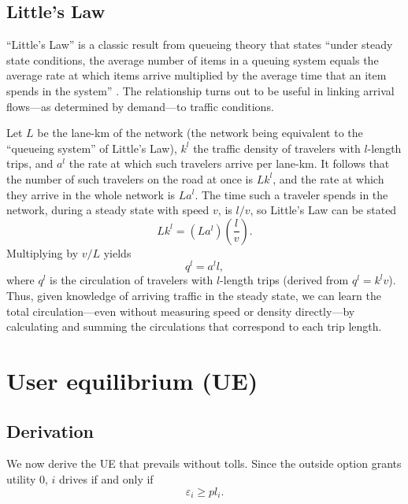 \documentclass[preprint,authoryear]{elsarticle}
\newcommand{\ve}{\varepsilon}
\begin{document}
\subsection{Little's Law}

``Little's Law'' is a classic result from queueing theory that states ``under steady state conditions, the average number of items in a queuing system equals the average rate at which items arrive multiplied by the average time that an item spends in the system'' \citep[p. 82]{Little2008}. The relationship turns out to be useful in linking arrival flows---as determined by demand---to traffic conditions.

Let $L$ be the lane-km of the network (the network being equivalent to the ``queueing system'' of Little's Law), $k^l$ the traffic density of travelers with $l$-length trips, and $a^l$ the rate at which such travelers arrive per lane-km. It follows that the number of such travelers on the road at once is $Lk^l$, and the rate at which they arrive in the whole network is $La^l$. The time such a traveler spends in the network, during a steady state with speed $v$, is $l/v$, so Little's Law can be stated
\begin{equation}\label{eq:little}
	Lk^l = (La^l) \left( \frac{l}{v}\right).
\end{equation}
Multiplying by $v/L$ yields
\begin{equation}
	q^l = a^l l,
\end{equation}
where $q^l$ is the circulation of travelers with $l$-length trips (derived from $q^l=k^lv$). Thus, given knowledge of arriving traffic in the steady state, we can learn the total circulation---even without measuring speed or density directly---by calculating and summing the circulations that correspond to each trip length.

\section{User equilibrium (UE)}
\label{sec:user_equilibrium}

\subsection{Derivation}
\label{ssec:derivation}

We now derive the UE that prevails without tolls. Since the outside option grants utility $0$, $i$ drives if and only if
\begin{equation} \label{eq:v-epsilon}
 \ve_i \geq pl_i.
\end{equation}
\end{document}
